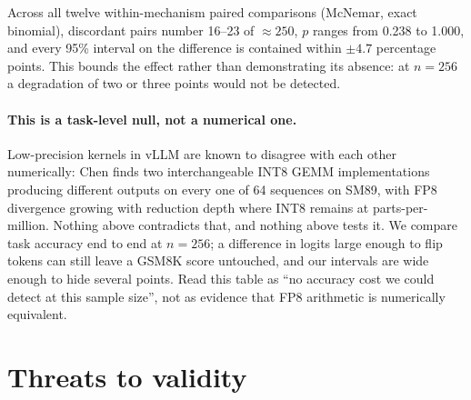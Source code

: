 \documentclass[11pt]{article}
\begin{document}
\noindent
Across all twelve within-mechanism paired comparisons (McNemar, exact
binomial), discordant pairs number 16--23 of ${\approx}250$, $p$ ranges from
0.238 to 1.000, and every 95\% interval on the difference is contained within
$\pm4.7$ percentage points. This bounds the effect rather than demonstrating
its absence: at $n=256$ a degradation of two or three points would not be
detected.

\paragraph{This is a task-level null, not a numerical one.} Low-precision
kernels in vLLM are known to disagree with each other numerically: Chen
\cite{chen2026integer} finds two interchangeable INT8 GEMM implementations
producing different outputs on every one of 64 sequences on SM89, with FP8
divergence growing with reduction depth where INT8 remains at
parts-per-million. Nothing above contradicts that, and nothing above tests
it. We compare task accuracy end to end at $n=256$; a difference in logits
large enough to flip tokens can still leave a GSM8K score untouched, and our
intervals are wide enough to hide several points. Read this table as ``no
accuracy cost we could detect at this sample size'', not as evidence that
FP8 arithmetic is numerically equivalent.

\section{Threats to validity}\label{sec:threats}
\end{document}
